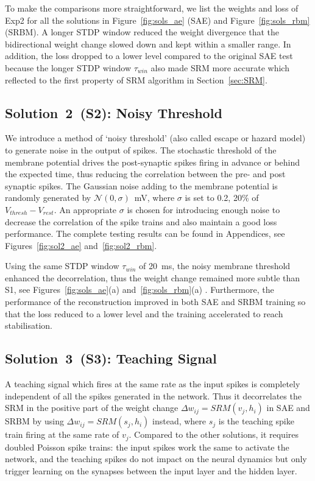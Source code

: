 To make the comparisons more straightforward, we list the weights and loss of Exp2 for all the solutions in Figure~\ref{fig:sols_ae} (SAE) and Figure~\ref{fig:sols_rbm} (SRBM).
A longer STDP window reduced the weight divergence that the bidirectional weight change slowed down and kept within a smaller range.
In addition, the loss dropped to a lower level compared to the original SAE test because the longer STDP window $\tau_{win}$ also made SRM more accurate which reflected to the first property of SRM algorithm in Section~\ref{sec:SRM}.



\subsection{Solution~2~(S2): Noisy Threshold}
We introduce a method of `noisy threshold' (also called escape or hazard model)~\cite{gerstner2002spiking} to generate noise in the output of spikes.
The stochastic threshold of the membrane potential drives the post-synaptic spikes firing in advance or behind the expected time, thus reducing the correlation between the pre- and post synaptic spikes.
The Gaussian noise adding to the membrane potential is randomly generated by $\mathcal{N}(0, \sigma)$~mV, where $\sigma$ is set to 0.2, 20\% of $V_{thresh} - V_{rest}.$
An appropriate $\sigma$ is chosen for introducing enough noise to decrease the correlation of the spike trains and also maintain a good loss performance.
The complete testing results can be found in Appendices, see Figures~\ref{fig:sol2_ae} and~\ref{fig:sol2_rbm}.

Using the same STDP window $\tau_{win}$ of 20~ms, the noisy membrane threshold enhanced the decorrelation, thus the weight change remained more subtle than S1, see Figures~\ref{fig:sols_ae}(a) and~\ref{fig:sols_rbm}(a) .
Furthermore, the performance of the reconstruction improved in both SAE and SRBM training so that the loss reduced to a lower level and the training accelerated to reach stabilisation. %


\subsection{Solution~3~(S3): Teaching Signal}
A teaching signal which fires at the same rate as the input spikes is completely independent of all the spikes generated in the network.
Thus it decorrelates the SRM in the positive part of the weight change $\Delta w_{ij} = SRM(v_j,h_i)$ in SAE and SRBM by using $\Delta w_{ij}=SRM(s_j,h_i)$ instead, where $s_j$ is the teaching spike train firing at the same rate of $v_j$.
Compared to the other solutions, it requires doubled Poisson spike trains: the input spikes work the same to activate the network, and the teaching spikes do not impact on the neural dynamics but only trigger learning on the synapses between the input layer and the hidden layer.

